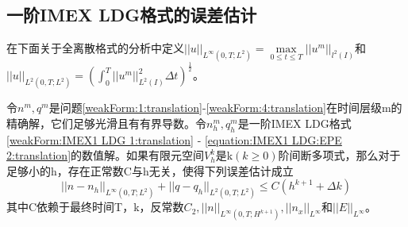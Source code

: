 \subsection{一阶IMEX LDG格式的误差估计}
在下面关于全离散格式的分析中定义$||u||_{L^{\infty}(0,T;L^2)}  = \max \limits_{0 \leq t \leq T}||u^m||_{l^2(I)}$和$||u||_{L^2(0,T;L^2)} = (\int_{0}^{T}||u^m||_{L^2(I)}^2\Delta t)^{\frac{1}{2}}$。
\begin{theorem}
    令$n^m,q^m$是问题\eqref{weakForm:1:translation}-\eqref{weakForm:4:translation}在时间层级m的精确解，它们足够光滑且有有界导数。令$n_h^m,q_h^m$是一阶IMEX LDG格式\eqref{weakForm:IMEX1 LDG 1:translation} - \eqref{equation:IMEX1 LDG:EPE 2:translation}的数值解。如果有限元空间$V_h^k$是k$(k\geq  0)$阶间断多项式，那么对于足够小的h，存在正常数C与h无关，使得下列误差估计成立
    \begin{equation}
        ||n-n_h||_{L^{\infty}(0,T;L^2)} + ||q - q_h||_{L^2(0,T;L^2)} \leq C(h^{k+1} + \Delta k)
    \end{equation}
    其中C依赖于最终时间T，k，反常数$C_2, ||n||_{L^{\infty}(0,T;H^{k+1})}, ||n_x||_{L^{\infty}}$和$||E||_{L^{\infty}}$。
\end{theorem}
